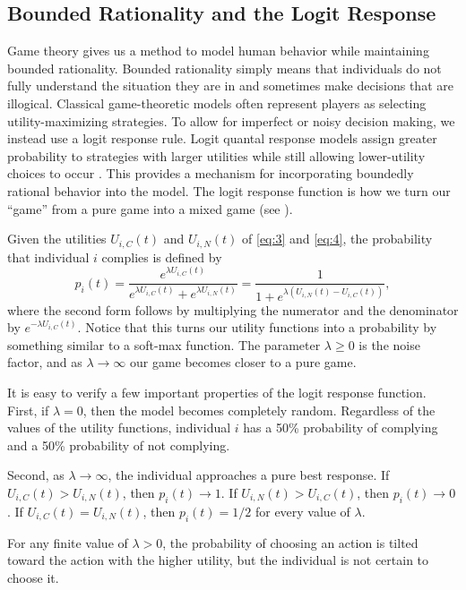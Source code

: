 \documentclass[11pt]{article}
\theoremstyle{definition}
\theoremstyle{plain}
\begin{document}
\subsection{Bounded Rationality and the Logit Response}
\label{sec:logit}

Game theory gives us a method to model human behavior while maintaining bounded rationality. Bounded rationality simply means that individuals do not fully understand the situation they are in and sometimes make decisions that are illogical. Classical game-theoretic models often represent players as selecting
utility-maximizing strategies. To allow for imperfect or noisy decision
making, we instead use a logit response rule. Logit quantal response models
assign greater probability to strategies with larger utilities while still
allowing lower-utility choices to occur \cite{mckelvey1995}. This provides
a mechanism for incorporating boundedly rational behavior into the model. The logit response function is how we turn our ``game'' from a pure game into a mixed game (see ).

Given the utilities $U_{i,C}(t)$ and $U_{i,N}(t)$ of \eqref{eq:3} and \eqref{eq:4}, the probability that individual $i$ complies is defined by
\begin{equation}\label{eq:logit}
p_i(t)=\frac{e^{\lambda U_{i,C}(t)}}{e^{\lambda U_{i,C}(t)}+e^{\lambda U_{i,N}(t)}}
= \frac{1}{1 + e^{\lambda (U_{i,N}(t)-U_{i,C}(t))}},
\end{equation}
where the second form follows by multiplying the numerator and the denominator by $e^{-\lambda U_{i,C}(t)}$. Notice that this turns our utility functions into a probability by something similar to a soft-max function. The parameter $\lambda\geq 0$ is the noise factor, and as $\lambda \rightarrow \infty$ our game becomes closer to a pure game.

It is easy to verify a few important properties of the logit response function. First, if $\lambda=0$, then the model becomes completely random. Regardless of the values of the utility functions, individual $i$ has a 50\% probability of complying and a 50\% probability of not complying.

Second, as $\lambda\rightarrow\infty$, the individual approaches a pure best response. If $U_{i,C}(t)>U_{i,N}(t)$, then $p_i(t)\rightarrow 1$. If $U_{i,N}(t)>U_{i,C}(t)$, then $p_i(t)\rightarrow 0$. If $U_{i,C}(t)=U_{i,N}(t)$, then $p_i(t)=1/2$ for every value of $\lambda$.

For any finite value of $\lambda>0$, the probability of choosing an action is tilted toward the action with the higher utility, but the individual is not certain to choose it.
\end{document}
